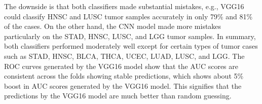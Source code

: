 \hspace*{3.5mm} The downside is that both classifiers made substantial mistakes, e.g., VGG16 could classify HNSC and LUSC tumor samples accurately in only 79\% and 81\% of the cases. On the other hand, the CNN model made more mistakes particularly on the STAD, HNSC, LUSC, and LGG tumor samples. In summary, both classifiers performed moderately well except for certain types of tumor cases such as STAD, HNSC, BLCA, THCA, UCEC, LUAD, LUSC, and LGG. The ROC curves generated by the VGG16 model 
show that the AUC scores are consistent across the folds showing stable predictions, which shows about 5\% boost in AUC scores generated by the VGG16 model. This signifies that the predictions by the VGG16 model are much better than random guessing. 

